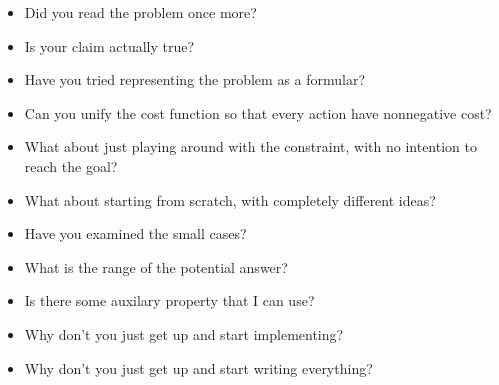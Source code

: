 \begin{itemize}
	\item Did you read the problem once more?
	\item Is your claim actually true?
	\item Have you tried representing the problem as a formular?
	\item Can you unify the cost function so that every action have nonnegative cost?
	\item What about just playing around with the constraint, with no intention to reach the goal?
	\item What about starting from scratch, with completely different ideas?
	\item Have you examined the small cases?
	\item What is the range of the potential answer?
	\item Is there some auxilary property that I can use?
	\item Why don't you just get up and start implementing?
	\item Why don't you just get up and start writing everything?
\end{itemize}